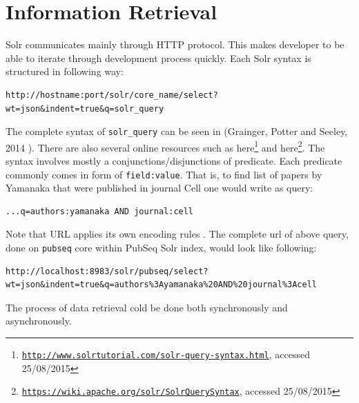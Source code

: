 \section{Information Retrieval}

Solr communicates mainly through HTTP protocol. This makes developer to be able to iterate through development process quickly. Each Solr syntax is structured in following way:

\begin{lstlisting}[breaklines]
http://hostname:port/solr/core_name/select?wt=json&indent=true&q=solr_query
\end{lstlisting}

The complete syntax of \texttt{solr\_query} can be seen in (Grainger, Potter and Seeley, 2014 \citep{grainger2014solr}). There are also several online resources such as here\footnote{\href{http://www.solrtutorial.com/solr-query-syntax.html}{\texttt{http://www.solrtutorial.com/solr-query-syntax.html}}, accessed 25/08/2015} and here\footnote{\href{https://wiki.apache.org/solr/SolrQuerySyntax}{\texttt{https://wiki.apache.org/solr/SolrQuerySyntax}}, accessed 25/08/2015}. The syntax involves mostly a conjunctions/disjunctions of predicate. Each predicate commonly comes in form of \texttt{field:value}. That is, to find list of papers by Yamanaka that were published in journal Cell one would write as query:

\begin{lstlisting}[breaklines]
...q=authors:yamanaka AND journal:cell
\end{lstlisting}

Note that URL applies its own encoding rules \citep{weiler2010rsync}. The complete url of above query, done on \texttt{pubseq} core within PubSeq Solr index, would look like following:

\begin{lstlisting}[breaklines]
http://localhost:8983/solr/pubseq/select?wt=json&indent=true&q=authors%3Ayamanaka%20AND%20journal%3Acell
\end{lstlisting}

The process of data retrieval cold be done both synchronously and asynchronously.


